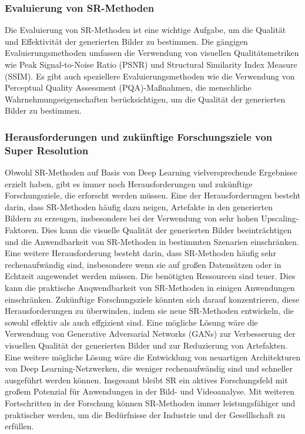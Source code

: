     \subsubsection{Evaluierung von SR-Methoden}
    
        Die Evaluierung von SR-Methoden ist eine wichtige Aufgabe, um die Qualität und Effektivität der generierten Bilder zu bestimmen.      
        Die gängigen Evaluierungsmethoden umfassen die Verwendung von visuellen Qualitätsmetriken wie Peak Signal-to-Noise Ratio (PSNR) und Structural Similarity Index Measure (SSIM).
        Es gibt auch speziellere Evaluierungsmethoden wie die Verwendung von Perceptual Quality Assessment (PQA)-Maßnahmen, die menschliche Wahrnehmungseigenschaften berücksichtigen, um die Qualität der generierten Bilder zu bestimmen.
    
    \subsubsection{Herausforderungen und zukünftige Forschungsziele von Super Resolution}
    
        Obwohl SR-Methoden auf Basis von Deep Learning vielversprechende Ergebnisse erzielt haben, gibt es immer noch Herausforderungen und zukünftige Forschungsziele, die erforscht werden müssen.
        Eine der Herausforderungen besteht darin, dass SR-Methoden häufig dazu neigen, Artefakte in den generierten Bildern zu erzeugen, insbesondere bei der Verwendung von sehr hohen Upscaling-Faktoren.      %
        Dies kann die visuelle Qualität der generierten Bilder beeinträchtigen und die Anwendbarkeit von SR-Methoden in bestimmten Szenarien einschränken.
        Eine weitere Herausforderung besteht darin, dass SR-Methoden häufig sehr rechenaufwändig sind, insbesondere wenn sie auf großen Datensätzen oder in Echtzeit angewendet werden müssen.      
        Die benötigten Ressourcen sind teuer.
        Dies kann die praktische Anqwendbarkeit von SR-Methoden in einigen Anwendungen einschränken.        
        Zukünftige Forschungsziele könnten sich darauf konzentrieren, diese Herausforderungen zu überwinden, indem sie neue SR-Methoden entwickeln, die sowohl effektiv als auch effgizient sind.      
        Eine mögliche Lösung wäre die Verwendung von Generative Adversarial Networks (GANs) zur Verbesserung der visuellen Qualität der generierten Bilder und zur Reduzierung von Artefakten.      %
        Eine weitere mögliche Lösung wäre die Entwicklung von neuartigen Architekturen von Deep Learning-Netzwerken, die weniger rechenaufwändig sind und schneller ausgeführt werden können.
        Insgesamt bleibt SR ein aktives Forschungsfeld mit großem Potenzial für Anwendungen in der Bild- und Videoanalyse.      
        Mit weiteren Fortschritten in der Forschung können SR-Methoden immer leistungsfähiger und praktischer werden, um die Bedürfnisse der Industrie und der Geselllschaft zu erfüllen.

